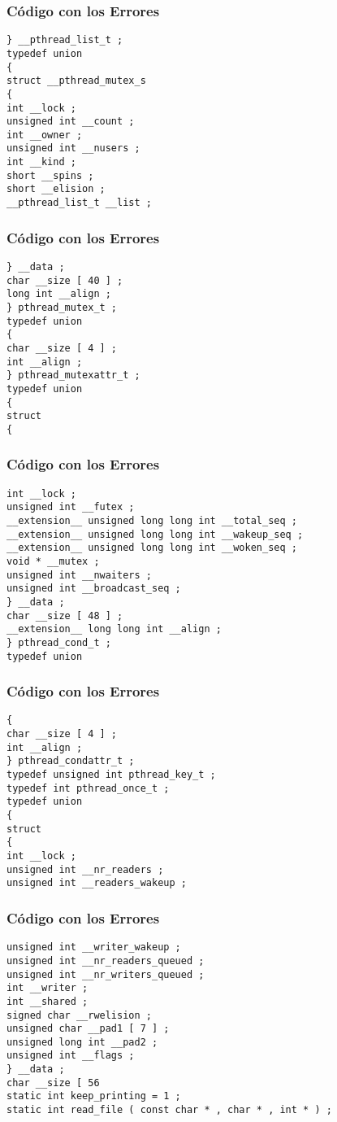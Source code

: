 \documentclass{beamer}
\begin{document}
\begin{frame}[fragile]
\frametitle{C\'odigo con los Errores}
\begin{lstlisting}[style=CStyle]
} __pthread_list_t ; 
typedef union 
{ 
struct __pthread_mutex_s 
{ 
int __lock ; 
unsigned int __count ; 
int __owner ; 
unsigned int __nusers ; 
int __kind ; 
short __spins ; 
short __elision ; 
__pthread_list_t __list ; 
\end{lstlisting}
\end{frame}
\begin{frame}[fragile]
\frametitle{C\'odigo con los Errores}
\begin{lstlisting}[style=CStyle]
} __data ; 
char __size [ 40 ] ; 
long int __align ; 
} pthread_mutex_t ; 
typedef union 
{ 
char __size [ 4 ] ; 
int __align ; 
} pthread_mutexattr_t ; 
typedef union 
{ 
struct 
{ 
\end{lstlisting}
\end{frame}
\begin{frame}[fragile]
\frametitle{C\'odigo con los Errores}
\begin{lstlisting}[style=CStyle]
int __lock ; 
unsigned int __futex ; 
__extension__ unsigned long long int __total_seq ; 
__extension__ unsigned long long int __wakeup_seq ; 
__extension__ unsigned long long int __woken_seq ; 
void * __mutex ; 
unsigned int __nwaiters ; 
unsigned int __broadcast_seq ; 
} __data ; 
char __size [ 48 ] ; 
__extension__ long long int __align ; 
} pthread_cond_t ; 
typedef union 
\end{lstlisting}
\end{frame}
\begin{frame}[fragile]
\frametitle{C\'odigo con los Errores}
\begin{lstlisting}[style=CStyle]
{ 
char __size [ 4 ] ; 
int __align ; 
} pthread_condattr_t ; 
typedef unsigned int pthread_key_t ; 
typedef int pthread_once_t ; 
typedef union 
{ 
struct 
{ 
int __lock ; 
unsigned int __nr_readers ; 
unsigned int __readers_wakeup ; 
\end{lstlisting}
\end{frame}
\begin{frame}[fragile]
\frametitle{C\'odigo con los Errores}
\begin{lstlisting}[style=CStyle]
unsigned int __writer_wakeup ; 
unsigned int __nr_readers_queued ; 
unsigned int __nr_writers_queued ; 
int __writer ; 
int __shared ; 
signed char __rwelision ; 
unsigned char __pad1 [ 7 ] ; 
unsigned long int __pad2 ; 
unsigned int __flags ; 
} __data ; 
char __size [ 56 
static int keep_printing = 1 ; 
static int read_file ( const char * , char * , int * ) ; 
\end{lstlisting}
\end{frame}
\end{document}
